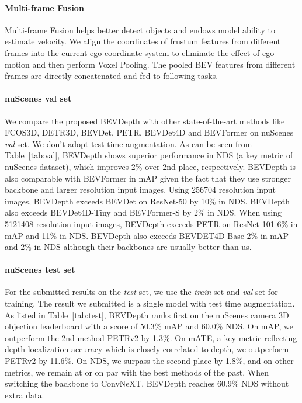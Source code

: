 \documentclass[twocolumn,letterpaper]{article}
\begin{document}
\paragraph{Multi-frame Fusion} Multi-frame Fusion helps better detect objects and endows model ability to estimate velocity. We align the coordinates of frustum features from different frames into the current ego coordinate system to eliminate the effect of ego-motion and then perform Voxel Pooling. The pooled BEV features from different frames are directly concatenated and fed to following tasks.

\paragraph{nuScenes val set}We compare the proposed BEVDepth with other state-of-the-art methods like FCOS3D, DETR3D, BEVDet, PETR, BEVDet4D and BEVFormer on nuScenes \emph{val} set. We don't adopt test time augmentation. As can be seen from Table~\ref{tab:val}, BEVDepth shows superior performance in NDS (a key metric of nuScenes dataset), which improves 2\% over 2nd place, respectively. BEVDepth is also comparable with BEVFormer in mAP given the fact that they use stronger backbone and larger resolution input images. Using 256704 resolution input images, BEVDepth exceeds BEVDet on ResNet-50 by 10\% in NDS. BEVDepth also exceeds BEVDet4D-Tiny and BEVFormer-S by 2\% in NDS. When using 5121408 resolution input images, BEVDepth exceeds PETR on ResNet-101 6\% in mAP and 11\% in NDS. BEVDepth also exceeds BEVDET4D-Base 2\% in mAP and 2\% in NDS although their backbones are usually better than us.


\paragraph{nuScenes test set} For the submitted results on the \emph{test} set, we use the \emph{train} set and \emph{val} set for training. The result we submitted is a single model with test time augmentation. As listed in Table~\ref{tab:test}, BEVDepth ranks first on the nuScenes camera 3D objection leaderboard with a score of 50.3\% mAP and 60.0\% NDS. On mAP, we outperform the 2nd method PETRv2 by 1.3\%. On mATE, a key metric reflecting depth localization accuracy which is closely correlated to depth, we outperform PETRv2 by 11.6\%. On NDS, we surpass the second place by 1.8\%, and on other metrics, we remain at or on par with the best methods of the past. When switching the backbone to ConvNeXT, BEVDepth reaches 60.9\% NDS without extra data.
\end{document}
